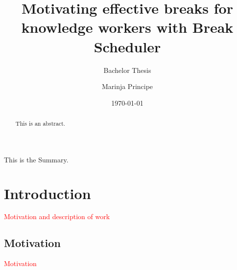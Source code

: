 \documentclass{hasel_thesis}
\date{\today}
\title{Motivating effective breaks for knowledge workers with Break  Scheduler }
\subtitle{Bachelor Thesis}
\author{Marinja Principe}
\begin{document}
\maketitle

\frontmatter

\begin{acknowledgements}
\end{acknowledgements}

\begin{abstract}
This is an abstract.
\end{abstract}

\begin{Summary}
This is the Summary.
\end{Summary}
    

\tableofcontents
\listoffigures
\listoftables
\lstlistoflistings

\mainmatter
\chapter{Introduction}

\textcolor{red}{Motivation and description of work}

\section{Motivation}

\textcolor{red}{Motivation}

\end{document}
